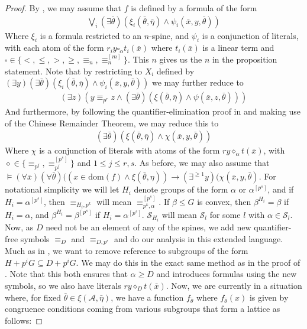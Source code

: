 \documentclass[a4paper,11pt]{article}
\newcommand{\nl}{\newline}
\newcommand{\tx}{\textrm}
\begin{document}
\begin{proof}
    By \cite{QE}, we may assume that $f$ is defined by a formula of the form
	\begin{align*}
		\bigvee\limits_{i}(\exists\bar\theta)(\xi_i(\bar\theta, \bar\eta)\wedge \psi_i(\bar x, y, \bar\theta))
	\end{align*}
	Where $\xi_i$ is a formula restricted to an $n$-spine, and $\psi_i$ is a conjunction of literals, with each atom of the form $r_iy\square_\alpha t_i(\bar x)$ where $t_i(\bar x)$ is a linear term and $\square \in \{<, \leq, >, \geq, \equiv_n, \equiv_n^{[m]}\}$. This $n$ gives us the $n$ in the proposition statement.
	\nl\nl
	Note that by restricting to $X_i$ defined by $(\exists y)(\exists\bar\theta)(\xi_i(\bar\theta, \bar\eta)\wedge \psi_i(\bar x, y, \bar\theta))$ we may further reduce to
	\begin{align*}
		(\exists z)(y\equiv_{p^r}z\wedge(\exists\bar\theta)(\xi(\bar\theta, \bar\eta)\wedge \psi(\bar x, z, \bar\theta)))
	\end{align*}
	And furthermore, by following the quantifier-elimination proof in \cite{QE} and making use of the Chinese Remainder Theorem, we may reduce this to 
	\begin{align*}
		(\exists\bar\theta)(\xi(\bar\theta, \bar\eta)\wedge \chi(\bar x, y, \bar\theta))
	\end{align*}
	Where $\chi$ is a conjunction of literals with atoms of the form $ry\diamond_\alpha t(\bar x)$, with $\diamond \in \{\equiv_{p^j}, \equiv_{p^j}^{[p^s]}\}$ and $1\leq j\leq r,s$. As before, we may also assume that $\models (\forall \bar x)(\forall\bar\theta)((x\in\tx{dom}(f)\wedge\xi(\bar\theta,\eta))\rightarrow(\exists^{\geq 1}y)(\chi(\bar x, y,\bar\theta)$.
    \nl\nl
    For notational simplicity we will let $H_i$ denote groups of the form $\alpha$ or $\alpha^{[p^s]}$, and if $H_i = \alpha^{[p^s]}$, then $\equiv_{H_i,p^k}$ will mean $\equiv_{p^k,\alpha}^{[p^s]}$. If $\beta\leq G$ is convex, then $\beta^{H_i} = \beta$ if $H_i=\alpha$, and $\beta^{H_i} = \beta^{[p^s]}$ if $H_i = \alpha^{[p^s]}$. $\mathcal{S}_{H_i}$ will mean $\mathcal{S}_l$ for some $l$ with $\alpha\in \mathcal{S}_l$.
	\nl\nl
    Now, as $D$ need not be an element of any of the spines, we add new quantifier-free symbols $\equiv_D$ and $\equiv_{D,p^r}$ and do our analysis in this extended language. Much as in , we want to remove reference to subgroups of the form $H+p^iG\subseteq D+p^iG$. We may do this in the exact same method as in the proof of . Note that this both ensures that $\alpha\geq D$ and introduces formulas using the new symbols, so we also have literals $ry\diamond_Dt(\bar x)$.
    \nl\nl
	Now, we are currently in a situation where, for fixed $\bar \theta\in\xi(\mathcal{A},\bar\eta)$, we have a function $f_{\bar\theta}$ where $f_{\bar\theta}(x)$ is given by congruence conditions coming from various subgroups that form a lattice as follows:


\end{proof}
\end{document}
